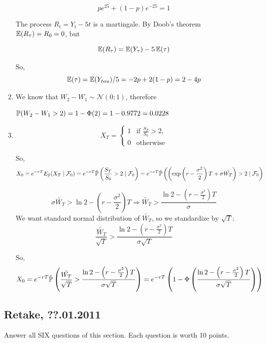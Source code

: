 \documentclass[12pt, a4paper]{article}
\newcommand{\cF}{\mathcal{F}}
\newcommand{\cN}{\mathcal{N}}
\begin{document}
\begin{enumerate}
\[
p e^{25} + (1-p) e^{-25} = 1
\]

The process $R_t = Y_t - 5t$ is a martingale. By Doob's theorem $\E(R_{\tau}) = R_0 = 0$, but

\[
\E(R_{\tau}) = \E(Y_{\tau}) - 5\E(\tau)
\]

So,
\[
\E(\tau) = \E(Y_{tau}) / 5 = -2p + 2(1-p)=2-4p
\]


\item We know that $W_{2}-W_{1}\sim \cN(0; 1)$, therefore

$\P(W_{2}-W_{1}> 2)=1-\Phi(2)=1-0.9772=0.0228$


\item

\[
 X_{T}=
 \begin{cases}
  1 & \text{if } \frac{S_{T}}{S_{0}}>2, \\
  0 & \text{otherwise}
 \end{cases}
\]

So,
\[
X_{0}=e^{-rT}E_{\tilde{\P}}(X_{T} \mid \cF_{0})=e^{-rT}\tilde{\P}\left(\frac{S_{T}}{S_{0}}>2  \mid \cF_{0}\right)=e^{-rT}\tilde{\P}\left(\left(\exp\left(r-\frac{\sigma^{2}}{2}\right)T+\sigma\tilde{W_{T}}\right)>2 \mid \cF_{0}\right)
\]

\[
 \sigma\tilde{W_{T}}>\ln 2-\left(r-\frac{\sigma^{2}}{2}\right)T \Rightarrow \tilde{W_{T}}>\frac{\ln 2-\left(r-\frac{\sigma^{2}}{2}\right)T}{\sigma}
\]
We want standard normal distribution of $\tilde{W_{T}}$, so we standardize by $\sqrt{T}$:
\[
 \frac{\tilde{W_{T}}}{\sqrt{T}}>\frac{\ln 2-\left(r-\frac{\sigma^{2}}{2}\right)T}{\sigma \sqrt{T}}
\]

So,
\[
 X_{0}=e^{-rT}\tilde{\P}\left( \frac{\tilde{W_{T}}}{\sqrt{T}}>\frac{\ln 2-\left(r-\frac{\sigma^{2}}{2}\right)T}{\sigma \sqrt{T}}\right)=e^{-rT}\left(1-\Phi\left(\frac{\ln 2-\left(r-\frac{\sigma^{2}}{2}\right)T}{\sigma \sqrt{T}}\right)\right)
\]



\end{enumerate}


\subsection{Retake, ??.01.2011}

Answer all SIX questions of this section. Each question is worth 10 points.
\end{document}
